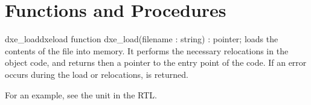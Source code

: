 \section{Functions and Procedures}
\begin{functionl}{dxe\_load}{dxeload}
\Declaration
function dxe\_load(filename : string) : pointer;
\Description
{} loads the contents of the file  into memory.
It performs the necessary relocations in the object code, and returns then
a pointer to the entry point of the code.
\Errors
If an error occurs during the load or relocations,  is returned.
\end{functionl}
For an example, see the  unit in the RTL.

